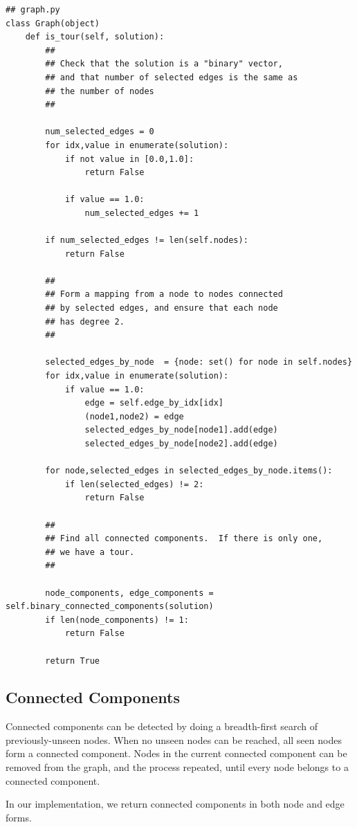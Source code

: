 \documentclass{article}
\begin{document}
\begin{lstlisting}
## graph.py
class Graph(object)
    def is_tour(self, solution):
        ##
        ## Check that the solution is a "binary" vector,
        ## and that number of selected edges is the same as
        ## the number of nodes
        ##

        num_selected_edges = 0
        for idx,value in enumerate(solution):
            if not value in [0.0,1.0]:
                return False

            if value == 1.0:
                num_selected_edges += 1

        if num_selected_edges != len(self.nodes):
            return False

        ##
        ## Form a mapping from a node to nodes connected
        ## by selected edges, and ensure that each node
        ## has degree 2.
        ##

        selected_edges_by_node  = {node: set() for node in self.nodes}
        for idx,value in enumerate(solution):
            if value == 1.0:
                edge = self.edge_by_idx[idx]
                (node1,node2) = edge
                selected_edges_by_node[node1].add(edge)
                selected_edges_by_node[node2].add(edge)

        for node,selected_edges in selected_edges_by_node.items():
            if len(selected_edges) != 2:
                return False

        ##
        ## Find all connected components.  If there is only one,
        ## we have a tour.
        ##

        node_components, edge_components = self.binary_connected_components(solution)
        if len(node_components) != 1:
            return False

        return True
\end{lstlisting}

\subsection{Connected Components}

Connected components can be detected
by doing a breadth-first search
of previously-unseen nodes.
When no unseen nodes can be reached,
all seen nodes form a connected component.
Nodes in the current connected component
can be removed from the graph,
and the process repeated,
until every node belongs to a connected component.

In our implementation,
we return connected components
in both node and edge forms.
\end{document}
